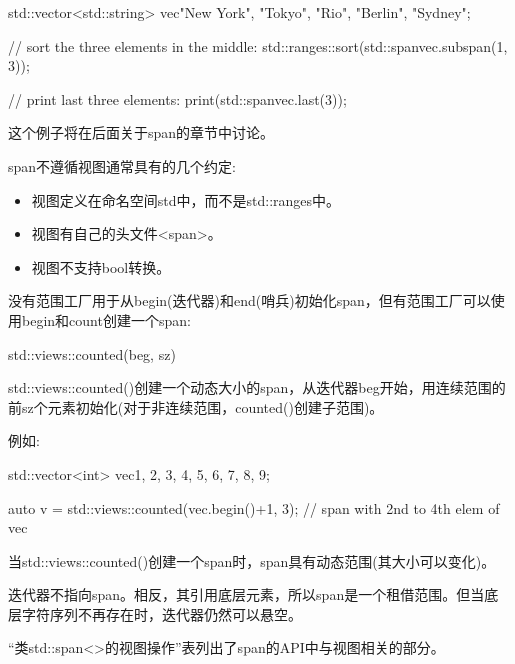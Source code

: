 \begin{cpp}
std::vector<std::string> vec{"New York", "Tokyo", "Rio", "Berlin", "Sydney"};

// sort the three elements in the middle:
std::ranges::sort(std::span{vec}.subspan(1, 3));

// print last three elements:
print(std::span{vec}.last(3));
\end{cpp}

这个例子将在后面关于span的章节中讨论。

span不遵循视图通常具有的几个约定:

\begin{itemize}
\item
视图定义在命名空间std中，而不是std::ranges中。

\item
视图有自己的头文件<span>。

\item
视图不支持bool转换。
\end{itemize}


没有范围工厂用于从begin(迭代器)和end(哨兵)初始化span，但有范围工厂可以使用begin和count创建一个span:

\begin{cpp}
std::views::counted(beg, sz)
\end{cpp}

std::views::counted()创建一个动态大小的span，从迭代器beg开始，用连续范围的前sz个元素初始化(对于非连续范围，counted()创建子范围)。

例如:

\begin{cpp}
std::vector<int> vec{1, 2, 3, 4, 5, 6, 7, 8, 9};

auto v = std::views::counted(vec.begin()+1, 3); // span with 2nd to 4th elem of vec
\end{cpp}

当std::views::counted()创建一个span时，span具有动态范围(其大小可以变化)。


迭代器不指向span。相反，其引用底层元素，所以span是一个租借范围。但当底层字符序列不再存在时，迭代器仍然可以悬空。


“类std::span<>的视图操作”表列出了span的API中与视图相关的部分。

